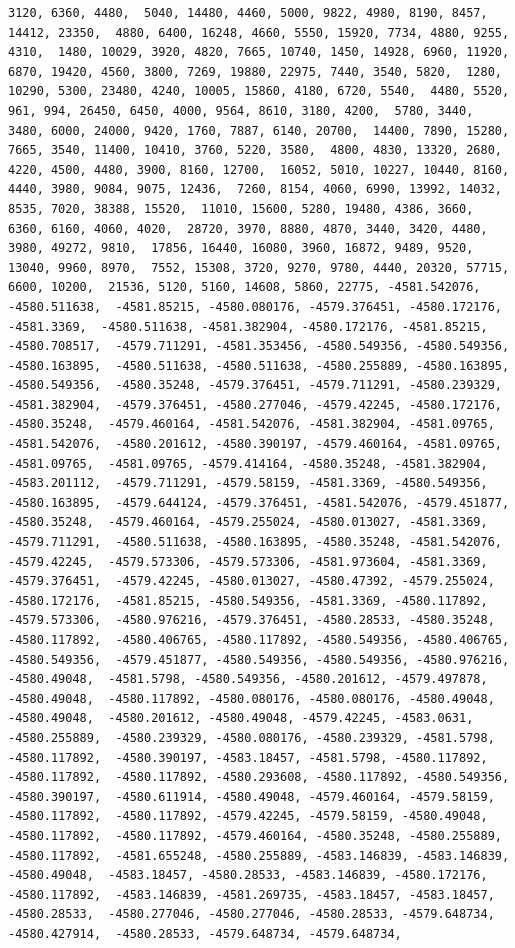 \documentclass[
]{article}
\begin{document}
\begin{verbatim}
3120, 6360, 4480,  5040, 14480, 4460, 5000, 9822, 4980, 8190, 8457, 14412, 23350,  4880, 6400, 16248, 4660, 5550, 15920, 7734, 4880, 9255, 4310,  1480, 10029, 3920, 4820, 7665, 10740, 1450, 14928, 6960, 11920,  6870, 19420, 4560, 3800, 7269, 19880, 22975, 7440, 3540, 5820,  1280, 10290, 5300, 23480, 4240, 10005, 15860, 4180, 6720, 5540,  4480, 5520, 961, 994, 26450, 6450, 4000, 9564, 8610, 3180, 4200,  5780, 3440, 3480, 6000, 24000, 9420, 1760, 7887, 6140, 20700,  14400, 7890, 15280, 7665, 3540, 11400, 10410, 3760, 5220, 3580,  4800, 4830, 13320, 2680, 4220, 4500, 4480, 3900, 8160, 12700,  16052, 5010, 10227, 10440, 8160, 4440, 3980, 9084, 9075, 12436,  7260, 8154, 4060, 6990, 13992, 14032, 8535, 7020, 38388, 15520,  11010, 15600, 5280, 19480, 4386, 3660, 6360, 6160, 4060, 4020,  28720, 3970, 8880, 4870, 3440, 3420, 4480, 3980, 49272, 9810,  17856, 16440, 16080, 3960, 16872, 9489, 9520, 13040, 9960, 8970,  7552, 15308, 3720, 9270, 9780, 4440, 20320, 57715, 6600, 10200,  21536, 5120, 5160, 14608, 5860, 22775, -4581.542076, -4580.511638,  -4581.85215, -4580.080176, -4579.376451, -4580.172176, -4581.3369,  -4580.511638, -4581.382904, -4580.172176, -4581.85215, -4580.708517,  -4579.711291, -4581.353456, -4580.549356, -4580.549356, -4580.163895,  -4580.511638, -4580.511638, -4580.255889, -4580.163895, -4580.549356,  -4580.35248, -4579.376451, -4579.711291, -4580.239329, -4581.382904,  -4579.376451, -4580.277046, -4579.42245, -4580.172176, -4580.35248,  -4579.460164, -4581.542076, -4581.382904, -4581.09765, -4581.542076,  -4580.201612, -4580.390197, -4579.460164, -4581.09765, -4581.09765,  -4581.09765, -4579.414164, -4580.35248, -4581.382904, -4583.201112,  -4579.711291, -4579.58159, -4581.3369, -4580.549356, -4580.163895,  -4579.644124, -4579.376451, -4581.542076, -4579.451877, -4580.35248,  -4579.460164, -4579.255024, -4580.013027, -4581.3369, -4579.711291,  -4580.511638, -4580.163895, -4580.35248, -4581.542076, -4579.42245,  -4579.573306, -4579.573306, -4581.973604, -4581.3369, -4579.376451,  -4579.42245, -4580.013027, -4580.47392, -4579.255024, -4580.172176,  -4581.85215, -4580.549356, -4581.3369, -4580.117892, -4579.573306,  -4580.976216, -4579.376451, -4580.28533, -4580.35248, -4580.117892,  -4580.406765, -4580.117892, -4580.549356, -4580.406765, -4580.549356,  -4579.451877, -4580.549356, -4580.549356, -4580.976216, -4580.49048,  -4581.5798, -4580.549356, -4580.201612, -4579.497878, -4580.49048,  -4580.117892, -4580.080176, -4580.080176, -4580.49048, -4580.49048,  -4580.201612, -4580.49048, -4579.42245, -4583.0631, -4580.255889,  -4580.239329, -4580.080176, -4580.239329, -4581.5798, -4580.117892,  -4580.390197, -4583.18457, -4581.5798, -4580.117892, -4580.117892,  -4580.117892, -4580.293608, -4580.117892, -4580.549356, -4580.390197,  -4580.611914, -4580.49048, -4579.460164, -4579.58159, -4580.117892,  -4580.117892, -4579.42245, -4579.58159, -4580.49048, -4580.117892,  -4580.117892, -4579.460164, -4580.35248, -4580.255889, -4580.117892,  -4581.655248, -4580.255889, -4583.146839, -4583.146839, -4580.49048,  -4583.18457, -4580.28533, -4583.146839, -4580.172176, -4580.117892,  -4583.146839, -4581.269735, -4583.18457, -4583.18457, -4580.28533,  -4580.277046, -4580.277046, -4580.28533, -4579.648734, -4580.427914,  -4580.28533, -4579.648734, -4579.648734, 
\end{verbatim}
\end{document}
